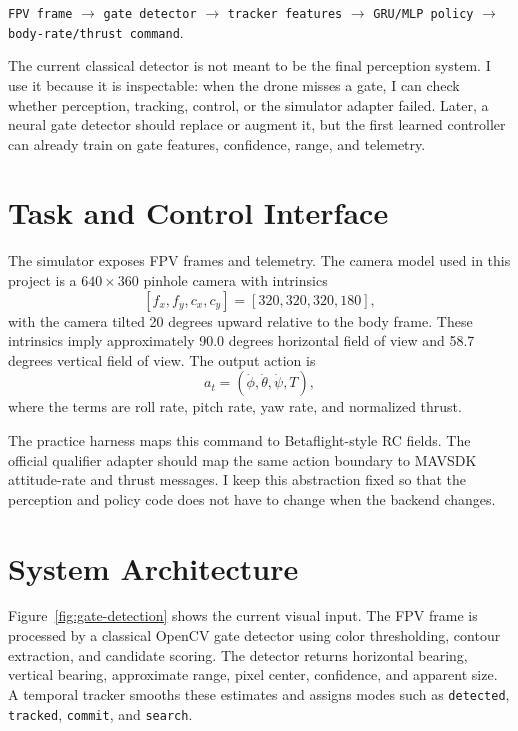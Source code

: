 \documentclass[11pt]{article}
\begin{document}
\begin{center}
\small
\texttt{FPV frame} $\rightarrow$ \texttt{gate detector} $\rightarrow$
\texttt{tracker features} $\rightarrow$ \texttt{GRU/MLP policy} $\rightarrow$
\texttt{body-rate/thrust command}.
\end{center}

The current classical detector is not meant to be the final perception system. I use it because it is inspectable: when the drone misses a gate, I can check whether perception, tracking, control, or the simulator adapter failed. Later, a neural gate detector should replace or augment it, but the first learned controller can already train on gate features, confidence, range, and telemetry.

\section{Task and Control Interface}

The simulator exposes FPV frames and telemetry. The camera model used in this project is a $640 \times 360$ pinhole camera with intrinsics
\[
  [f_x, f_y, c_x, c_y] = [320, 320, 320, 180],
\]
with the camera tilted 20 degrees upward relative to the body frame. These intrinsics imply approximately 90.0 degrees horizontal field of view and 58.7 degrees vertical field of view. The output action is
\[
  a_t = (\dot{\phi}, \dot{\theta}, \dot{\psi}, T),
\]
where the terms are roll rate, pitch rate, yaw rate, and normalized thrust.

The practice harness maps this command to Betaflight-style RC fields. The official qualifier adapter should map the same action boundary to MAVSDK attitude-rate and thrust messages. I keep this abstraction fixed so that the perception and policy code does not have to change when the backend changes.

\section{System Architecture}

Figure~\ref{fig:gate-detection} shows the current visual input. The FPV frame is processed by a classical OpenCV gate detector using color thresholding, contour extraction, and candidate scoring. The detector returns horizontal bearing, vertical bearing, approximate range, pixel center, confidence, and apparent size. A temporal tracker smooths these estimates and assigns modes such as \texttt{detected}, \texttt{tracked}, \texttt{commit}, and \texttt{search}.
\end{document}

